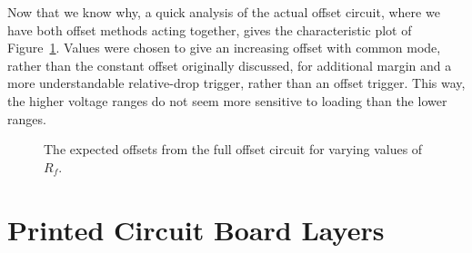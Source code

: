 \documentclass[letterpaper,twocolumn,11pt]{article}
\begin{document}
Now that we know why, a quick analysis of the actual offset circuit, where we
have both offset methods acting together, gives the characteristic plot of
Figure~\ref{fig:final_off}. Values were chosen to give an increasing offset with
common mode, rather than the constant offset originally discussed, for
additional margin and a more understandable relative-drop trigger, rather than
an offset trigger. This way, the higher voltage ranges do not seem more
sensitive to loading than the lower ranges.

\begin{figure}
  \centering
  
  \caption{The expected offsets from the full offset circuit for varying values
  of $R_f$.}
  \label{fig:final_off}
\end{figure}

\clearpage



\section{Printed Circuit Board Layers}











\end{document}
